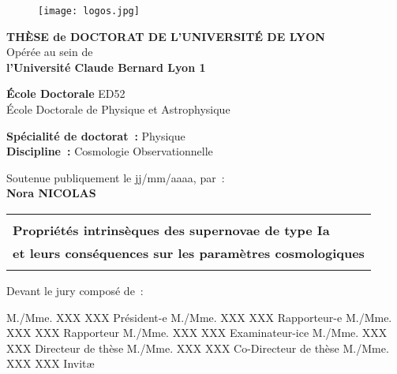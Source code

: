 \documentclass[../main/main.tex]{subfiles}
\begin{document}
\begin{titlepage}
    \begin{center}
        \begin{figure}[h]
            \centering
            \texttt{[image: logos.jpg]}
        \end{figure}

        \vfill

        {\large\bfseries THÈSE de DOCTORAT DE L'UNIVERSITÉ DE LYON\\}
        {Opérée au sein de\\}
        {\large \bfseries l'Université Claude Bernard Lyon 1\\}
        \bigbreak

        {\large \textbf{École Doctorale} ED52\\
        École Doctorale de Physique et Astrophysique}
        \bigbreak

        {\large \textbf{Spécialité de doctorat~:} Physique \\}
        {\large \textbf{Discipline~:} Cosmologie Observationnelle}

        \vfill

        {Soutenue publiquement le jj/mm/aaaa, par~:\\}
        {\Large\bfseries {Nora NICOLAS}\\}
        \vspace{0.5cm}
        \begin{tabularx}{\linewidth}{Y}
            \toprule
            \\[0.2em]
            \Large \bfseries Propriétés intrinsèques des supernovae de type Ia\\
            \Large \bfseries et leurs conséquences sur les paramètres
            cosmologiques\\
            \\[-0.2em]
            \bottomrule
        \end{tabularx}

        \vfill

    \end{center}

\vfill

Devant le jury composé de~: \bigbreak

M./Mme. XXX XXX \hfill Président-e\smallbreak
M./Mme. XXX XXX \hfill Rapporteur-e\smallbreak
M./Mme. XXX XXX \hfill Rapporteur\smallbreak
M./Mme. XXX XXX \hfill Examinateur-ice\smallbreak
M./Mme. XXX XXX \hfill Directeur de thèse\smallbreak
M./Mme. XXX XXX \hfill Co-Directeur de thèse\smallbreak
M./Mme. XXX XXX \hfill Invitæ\smallbreak

\vfill

\end{titlepage}
\end{document}
